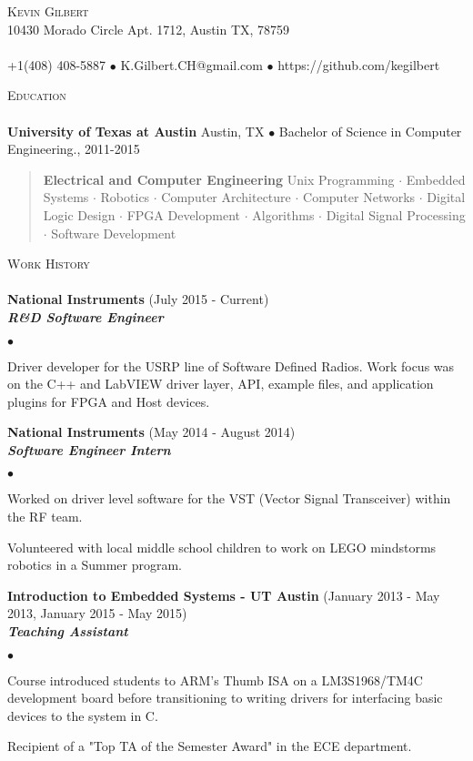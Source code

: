 \documentclass[11pt]{article}
\newcommand{\area}[2]{\vspace*{-9pt} \begin{verse}\textbf{#1}   #2 \end{verse}  }
\newcommand{\lineunder}{\vspace*{-8pt} \\ \hspace*{-18pt} \hrulefill \\}
\newcommand{\header}[1]{{\hspace*{-10pt}\vspace*{6pt} \textsc{#1}} \vspace*{-6pt} \lineunder}
\newcommand{\employer}[3]{{ \textbf{#1} (#2)\\ \textbf{\emph{#3}}}\\  }
\newcommand{\contact}[3]{
\vspace*{-8pt}
\begin{center}
{\LARGE \scshape {#1}}\\
#2 \lineunder 
#3
\end{center}
\vspace*{-8pt}
}
\newenvironment{achievements}{\begin{list}{$\bullet$}{\topsep 0pt \itemsep -2pt}}{\vspace*{4pt}\end{list}}
\newcommand{\schoolwithcourses}[4]{
 \textbf{#1} #2 $\bullet$ #3\\ 
\vspace*{5pt}
}
\begin{document}
\small
\smallskip
\vspace*{-30pt}

\contact{Kevin Gilbert}
{10430 Morado Circle Apt. 1712, Austin TX, 78759}
{+1(408) 408-5887 $\bullet$ K.Gilbert.CH@gmail.com  $\bullet$ https://github.com/kegilbert}

\header{Education}

\schoolwithcourses{University of Texas at Austin}{Austin, TX}{Bachelor of Science in Computer Engineering., 2011-2015}
{Cumulative GPA: 3.33/4.00}
	\area{Electrical and Computer Engineering}{ Unix Programming $\cdot$ Embedded Systems $\cdot$ Robotics $\cdot$ Computer Architecture $\cdot$ Computer Networks $\cdot$ Digital Logic Design $\cdot$ FPGA Development $\cdot$
 Algorithms $\cdot$ Digital Signal Processing $\cdot$ Software Development}

\header{Work History}
\employer{National Instruments}{July 2015 - Current}{R\&D Software Engineer}
	\begin{achievements}
	\item Driver developer for the USRP line of Software Defined Radios. Work focus was on the C++ and LabVIEW driver layer, API, example files, and application plugins for FPGA and Host devices.
    \end{achievements}
\employer{National Instruments}{May 2014 - August 2014}{Software Engineer Intern}
	\begin{achievements}
	\item Worked on driver level software for the VST (Vector Signal Transceiver) within the RF team.
    \item Volunteered with local middle school children to work on LEGO mindstorms robotics in a Summer program.
	\end{achievements}
    
\employer{Introduction to Embedded Systems - UT Austin}{January 2013 - May 2013, January 2015 - May 2015} {Teaching Assistant}
	\begin{achievements}
	\item Course introduced students to ARM’s Thumb ISA on a LM3S1968/TM4C development board before transitioning to writing drivers for interfacing basic devices to the system in C.
	\item Recipient of a "Top TA of the Semester Award" in the ECE department.
	\end{achievements}
\end{document}

